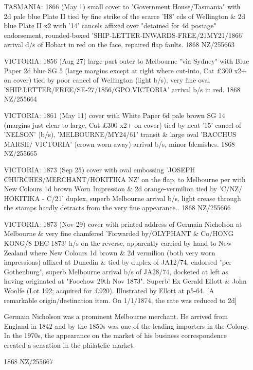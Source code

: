 \documentclass[justified]{tufte-book}
\begin{document}
%
{TASMANIA: 1866 (May 1) small cover to "Government House/Tasmania" with 2d pale blue Plate II tied by fine strike of the scarce 'H8' cds of Wellington \& 2d blue Plate II x2 with '14' cancels affixed over "detained for 4d postage" endorsement, rounded-boxed 'SHIP-LETTER-INWARDS-FREE/21MY21/1866' arrival d/s of Hobart in red on the face, repaired flap faults.}%
{1868}%
{NZ/255663}%
{}%
{}
{}%
{}

%
{VICTORIA: 1856 (Aug 27) large-part outer to Melbourne "via Sydney" with Blue Paper 2d blue SG 5 (large margins except at right where cut-into, Cat £300 x2+ on cover) tied by poor cancel of Wellington (light b/s), very fine oval 'SHIP.LETTER/FREE/SE-27/1856/GPO.VICTORIA' arrival b/s in red.}%
{1868}%
{NZ/255664}%
{}%
{}
{}%
{}

%
{ VICTORIA: 1861 (May 11) cover with White Paper 6d pale brown SG 14 (margins just clear to large, Cat £300 x2+ on cover) tied by neat '15' cancel of 'NELSON' (b/s), 'MELBOURNE/MY24/61' transit \& large oval 'BACCHUS MARSH/ VICTORIA' (crown worn away) arrival b/s, minor blemishes.}%
{1868}%
{NZ/255665}%
{}%
{}
{}%
{}

%
{VICTORIA: 1873 (Sep 25) cover with oval embossing 'JOSEPH CHURCHES/MERCHANT/HOKITIKA NZ' on the flap, to Melbourne per  with New Colours 1d brown Worn Impression \& 2d orange-vermilion tied by 'C/NZ/ HOKITIKA - C/21' duplex, superb Melbourne arrival b/s, light crease through the stamps hardly detracts from the very fine appearance..}%
{1868}%
{NZ/255666}%
{}%
{}
{}%
{}

%
{VICTORIA: 1873 (Nov 29) cover with printed address of Germain Nicholson at Melbourne \& very fine chamfered 'Forwarded by/OLYPHANT \& Co/HONG KONG/8 DEC 1873' h/s on the reverse, apparently carried by hand to New Zealand where New Colours 1d brown \& 2d vermilion (both very worn impressions) affixed at Dunedin \& tied by duplex of JA12/74, endorsed "per Gothenburg", superb Melbourne arrival b/s of JA28/74, docketed at left as having originated at "Foochow 29th Nov 1873". Superb! Ex Gerald Ellott \& John Woolfe (Lot 192; acquired for £920). Illustrated by Ellott at p5-64. [A remarkable origin/destination item. On 1/1/1874, the rate was reduced to 2d] 

Germain Nicholson was a prominent Melbourne merchant. He arrived from England in 1842 and by the 1850s was one of the leading importers in the Colony. In the 1970s, the appearance on the market of his business correspondence created a sensation in the philatelic market.}%
{1868}%
{NZ/255667}%
{}%
{}
{}%
{}
\end{document}
